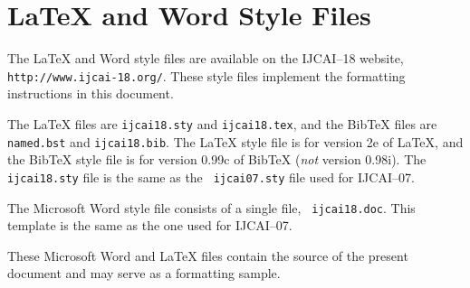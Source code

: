 \documentclass{article}
\begin{document}
\appendix

\section{\LaTeX{} and Word Style Files}\label{stylefiles}

The \LaTeX{} and Word style files are available on the IJCAI--18
website, {\tt http://www.ijcai-18.org/}.
These style files implement the formatting instructions in this
document.

The \LaTeX{} files are {\tt ijcai18.sty} and {\tt ijcai18.tex}, and
the Bib\TeX{} files are {\tt named.bst} and {\tt ijcai18.bib}. The
\LaTeX{} style file is for version 2e of \LaTeX{}, and the Bib\TeX{}
style file is for version 0.99c of Bib\TeX{} ({\em not} version
0.98i). The {\tt ijcai18.sty} file is the same as the {\tt
ijcai07.sty} file used for IJCAI--07.

The Microsoft Word style file consists of a single file, {\tt
ijcai18.doc}. This template is the same as the one used for
IJCAI--07.

These Microsoft Word and \LaTeX{} files contain the source of the
present document and may serve as a formatting sample.  




\end{document}
